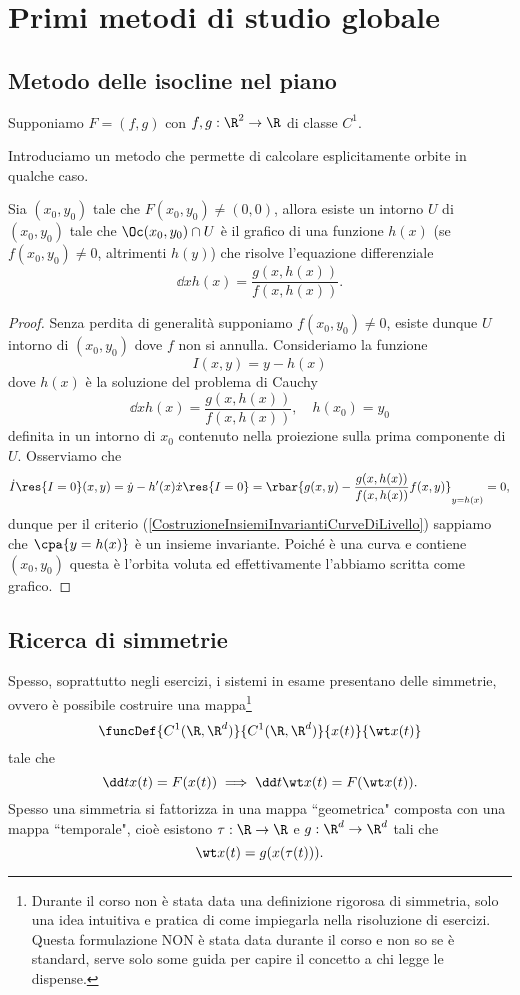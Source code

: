 \chapter{Primi metodi di studio globale}
\section{Metodo delle isocline nel piano}
Supponiamo $F=(f,g)$ con $f,g:\R^2\to \R$ di classe $C^1$.

\noindent
Introduciamo un metodo che permette di calcolare esplicitamente orbite in qualche caso.
\begin{proposition}\label{MetodoIsoclineNelPiano}
Sia $(x_0,y_0)$ tale che $F(x_0,y_0)\neq (0,0)$, allora esiste un intorno $U$ di $(x_0,y_0)$ tale che $\Oc(x_0,y_0)\cap U$ \`e il grafico di una funzione $h(x)$ (se $f(x_0,y_0)\neq 0$, altrimenti $h(y)$) che risolve l'equazione differenziale
\[\dd x{h(x)}=\frac{g(x,h(x))}{f(x,h(x))}.\]
\end{proposition}
\begin{proof}
Senza perdita di generalit\`a supponiamo $f(x_0,y_0)\neq 0$, esiste dunque $U$ intorno di $(x_0,y_0)$ dove $f$ non si annulla. Consideriamo la funzione
\[I(x,y)=y-h(x)\]
dove $h(x)$ \`e la soluzione del problema di Cauchy 
\[\dd x{h(x)}=\frac{g(x,h(x))}{f(x,h(x))},\quad h(x_0)=y_0\] 
definita in un intorno di $x_0$ contenuto nella proiezione sulla prima componente di $U$. Osserviamo che
\[\dot I\res{I=0}(x,y)=\dot y-h'(x)\dot x\res{I=0}=\rbar{g(x,y)-\frac{g(x,h(x))}{f(x,h(x))}f(x,y)}_{y=h(x)}=0,\]
dunque per il criterio (\ref{CostruzioneInsiemiInvariantiCurveDiLivello}) sappiamo che $\cpa{y=h(x)}$ \`e un insieme invariante. Poich\'e \`e una curva e contiene $(x_0,y_0)$ questa \`e l'orbita voluta ed effettivamente l'abbiamo scritta come grafico.
\end{proof}

\section{Ricerca di simmetrie}
Spesso, soprattutto negli esercizi, i sistemi in esame presentano delle simmetrie, ovvero \`e possibile costruire una mappa\footnote{Durante il corso non \`e stata data una definizione rigorosa di simmetria, solo una idea intuitiva e pratica di come impiegarla nella risoluzione di esercizi. Questa formulazione NON \`e stata data durante il corso e non so se \`e standard, serve solo some guida per capire il concetto a chi legge le dispense.}
\[\funcDef{C^1(\R,\R^d)}{C^1(\R,\R^d)}{x(t)}{\wt x(t)}\]
tale che 
\[\dd t{}x(t)=F(x(t))\implies \dd t{}\wt x(t)=F(\wt x(t)).\]
Spesso una simmetria si fattorizza in una mappa ``geometrica" composta con una mappa ``temporale", cio\`e esistono $\tau:\R\to \R$ e $g:\R^d\to\R^d$ tali che
\[\wt x(t)=g(x(\tau(t))).\]

